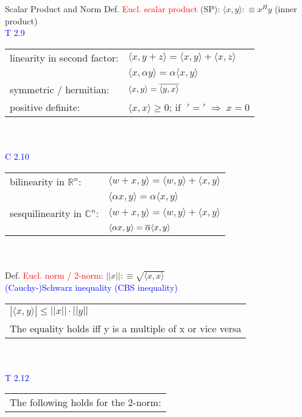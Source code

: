 \begin{mainbox}{Scalar Product and Norm}
Def. \textcolor{red}{Eucl. scalar product} (SP): $\langle x,y\rangle :\equiv x^Hy$ (inner product)
\smallskip\\
\textcolor{blue}{T 2.9}\\
\begin{tabular}{ll}
	linearity in second factor: & $\langle x,y+z\rangle = \langle x,y\rangle + \langle x,z\rangle$\\
	& $\langle x,\alpha y\rangle = \alpha \langle x,y\rangle$\\
	symmetric / hermitian: & $\langle x,y\rangle = \overline{\langle y,x \rangle}$\\
	positive definite: & $\langle x,x\rangle \geq 0$; if $\;'='\;\Rightarrow\;x = 0$\\ 
\end{tabular}\\
\smallskip\\
\textcolor{blue}{C 2.10}\\
\begin{tabular}{ll}
	bilinearity in $\mathbb{R}^n$: & $\langle w+x,y\rangle = \langle w,y\rangle + \langle x,y\rangle$\\
	& $\langle \alpha x,y\rangle = \alpha \langle x,y\rangle$\\
	sesquilinearity in $\mathbb{C}^n$: & $\langle w+x,y\rangle = \langle w,y\rangle + \langle x,y\rangle$\\
	& $\langle \alpha x,y\rangle = \overline{\alpha} \langle x,y\rangle$\\ 
\end{tabular}\\
\smallskip\\
Def. \textcolor{red}{Eucl. norm / 2-norm}: $||x|| :\equiv \sqrt{\langle x,x \rangle}$
\smallskip\\
\textcolor{blue}{(Cauchy-)Schwarz inequality (CBS inequality)}\\
\begin{tabular}{l}
	$|\langle x,y\rangle| \leq ||x|| \cdot ||y||$\\
	The equality holds iff y is a multiple of x or vice versa\\
\end{tabular}\\
\smallskip\\
\textcolor{blue}{T 2.12}\\
\begin{tabular}{ll}
	\multicolumn{2}{l}{The following holds for the 2-norm:} \\

\end{tabular}
\end{mainbox}
